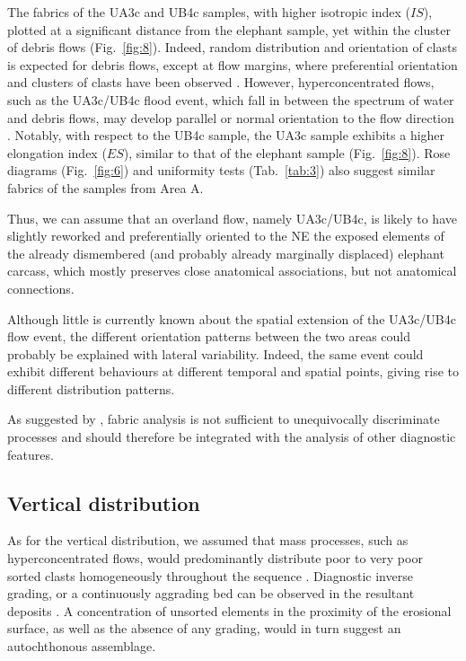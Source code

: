 \documentclass[preprint,authoryear,times]{elsarticle} %
\begin{document}
The fabrics of the UA3c and UB4c samples, with higher isotropic index ($IS$), plotted at a significant distance from the elephant sample, yet within the cluster of debris flows (Fig.~\ref{fig:8}). Indeed, random distribution and orientation of clasts is expected for debris flows, except at flow margins, where preferential orientation and clusters of clasts have been observed \citep{Pierson2005}. However, hyperconcentrated flows, such as the UA3c/UB4c flood event, which fall in between the spectrum of water and debris flows, may develop parallel or normal orientation to the flow direction \citep{Lindsay1968,Benvenuti2002}. Notably, with respect to the UB4c sample, the UA3c sample exhibits a higher elongation index ($ES$), similar to that of the elephant sample (Fig.~\ref{fig:8}). Rose diagrams (Fig.~\ref{fig:6}) and uniformity tests (Tab.~\ref{tab:3}) also suggest similar fabrics of the samples from Area A.

Thus, we can assume that an overland flow, namely UA3c/UB4c, is likely to have slightly reworked and preferentially oriented to the NE the exposed elements of the already dismembered (and probably already marginally displaced) elephant carcass, which mostly preserves close anatomical associations, but not anatomical connections.

Although little is currently known about the spatial extension of the UA3c/UB4c flow event, the different orientation patterns between the two areas could probably be explained with lateral variability. Indeed, the same event could exhibit different behaviours at different temporal and spatial points, giving rise to different distribution patterns.

As suggested by \cite{Lenoble2004}, fabric analysis is not sufficient to unequivocally discriminate processes and should therefore be integrated with the analysis of other diagnostic features.

\subsection{Vertical distribution}

As for the vertical distribution, we assumed that mass processes, such as hyperconcentrated flows, would predominantly distribute poor to very poor sorted clasts homogeneously throughout the sequence \citep{Pierson2005}. Diagnostic inverse grading, or a continuously aggrading bed can be observed in the resultant deposits \citep{Benvenuti2002}. A concentration of unsorted elements in the proximity of the erosional surface, as well as the absence of any grading, would in turn suggest an autochthonous assemblage.
\end{document}
